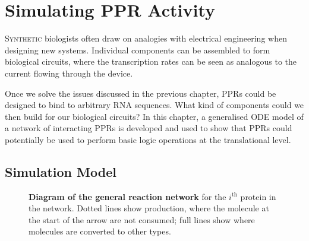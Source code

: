 
\chapter{Simulating PPR Activity} 
\label{chap:simulation}

\lettrine{S}{ynthetic} biologists often draw on analogies with electrical
engineering when designing new systems.
Individual components can be assembled to form biological circuits, where the 
transcription rates can be seen as analogous to the current flowing through 
the device.

Once we solve the issues discussed in the previous chapter,
PPRs could be designed to bind to arbitrary RNA sequences.
What kind of components could we then build for our biological circuits?
In this chapter, a generalised ODE model of a network of interacting PPRs is
developed and used to show that PPRs could potentially be used to perform basic
logic operations at the translational level.

\section{Simulation Model}
\label{sec:sim_model}

\begin{figure}
  \centering
  \caption{
  \textbf{Diagram of the general reaction network} 
  for the $i^{\mathrm{th}}$ protein in the network. 
  Dotted lines show production, where the molecule at the start
  of the arrow are not consumed; full lines show where molecules are converted
  to other types.
  \label{fig:simulation}}
\end{figure}

